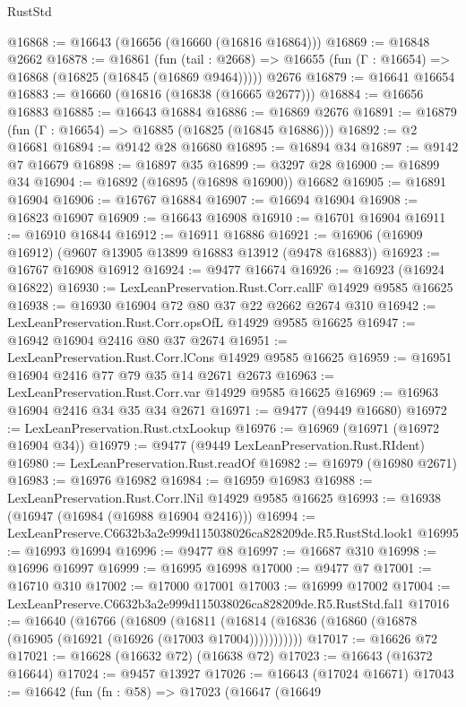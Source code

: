 \begin{lexlean}{RustStd}
\begin{coremodule}
@16868 := @16643 (@16656 (@16660 (@16816 @16864)))
@16869 := @16848 @2662
@16878 := @16861
    (fun (tail : @2668) => @16655 (fun (Γ : @16654) => @16868 (@16825 (@16845 (@16869 @9464)))))
    @2676
@16879 := @16641 @16654
@16883 := @16660 (@16816 (@16838 (@16665 @2677)))
@16884 := @16656 @16883
@16885 := @16643 @16884
@16886 := @16869 @2676
@16891 := @16879 (fun (Γ : @16654) => @16885 (@16825 (@16845 @16886)))
@16892 := @2 @16681
@16894 := @9142 @28 @16680
@16895 := @16894 @34
@16897 := @9142 @7 @16679
@16898 := @16897 @35
@16899 := @3297 @28
@16900 := @16899 @34
@16904 := @16892 (@16895 (@16898 @16900)) @16682
@16905 := @16891 @16904
@16906 := @16767 @16884
@16907 := @16694 @16904
@16908 := @16823 @16907
@16909 := @16643 @16908
@16910 := @16701 @16904
@16911 := @16910 @16844
@16912 := @16911 @16886
@16921 := @16906 (@16909 @16912) (@9607 @13905 @13899 @16883 @13912 (@9478 @16883))
@16923 := @16767 @16908 @16912
@16924 := @9477 @16674
@16926 := @16923 (@16924 @16822)
@16930 := LexLeanPreservation.Rust.Corr.callF @14929 @9585 @16625
@16938 := @16930 @16904 @72 @80 @37 @22 @2662 @2674 @310
@16942 := LexLeanPreservation.Rust.Corr.opsOfL @14929 @9585 @16625
@16947 := @16942 @16904 @2416 @80 @37 @2674
@16951 := LexLeanPreservation.Rust.Corr.lCons @14929 @9585 @16625
@16959 := @16951 @16904 @2416 @77 @79 @35 @14 @2671 @2673
@16963 := LexLeanPreservation.Rust.Corr.var @14929 @9585 @16625
@16969 := @16963 @16904 @2416 @34 @35 @34 @2671
@16971 := @9477 (@9449 @16680)
@16972 := LexLeanPreservation.Rust.ctxLookup
@16976 := @16969 (@16971 (@16972 @16904 @34))
@16979 := @9477 (@9449 LexLeanPreservation.Rust.RIdent)
@16980 := LexLeanPreservation.Rust.readOf
@16982 := @16979 (@16980 @2671)
@16983 := @16976 @16982
@16984 := @16959 @16983
@16988 := LexLeanPreservation.Rust.Corr.lNil @14929 @9585 @16625
@16993 := @16938 (@16947 (@16984 (@16988 @16904 @2416)))
@16994 := LexLeanPreserve.C6632b3a2e999d115038026ca828209de.R5.RustStd.look1
@16995 := @16993 @16994
@16996 := @9477 @8
@16997 := @16687 @310
@16998 := @16996 @16997
@16999 := @16995 @16998
@17000 := @9477 @7
@17001 := @16710 @310
@17002 := @17000 @17001
@17003 := @16999 @17002
@17004 := LexLeanPreserve.C6632b3a2e999d115038026ca828209de.R5.RustStd.fal1
@17016 := @16640
    (@16766
      (@16809
        (@16811 (@16814 (@16836 (@16860 (@16878 (@16905 (@16921 (@16926 (@17003 @17004)))))))))))
@17017 := @16626 @72
@17021 := @16628 (@16632 @72) (@16638 @72)
@17023 := @16643 (@16372 @16644)
@17024 := @9457 @13927
@17026 := @16643 (@17024 @16671)
@17043 := @16642
    (fun (fn : @58) =>
    @17023
      (@16647
        (@16649

\end{coremodule}
\end{lexlean}
